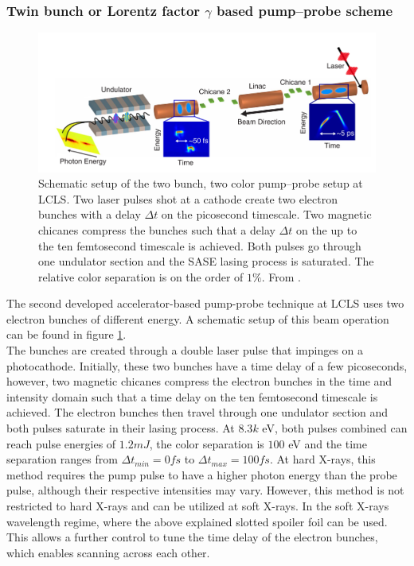 \subsubsection{Twin bunch or Lorentz factor $\gamma$ based pump--probe scheme}
\begin{figure}
	\centering
		\includegraphics[width=1.00\textwidth]{images/Agos-pump-probe-scheme.png}
	\caption[Schematic setup of the bunch based pump-probe setup.]{Schematic setup of the two bunch, two color pump--probe setup at LCLS. Two laser pulses shot at a cathode create two electron bunches with a delay $\Delta t$ on the picosecond timescale. Two magnetic chicanes compress the bunches such that a delay $\Delta t$ on the up to the ten femtosecond timescale is achieved. Both pulses go through one undulator section and the SASE lasing process is saturated. The relative color separation is on the order of $1\%$. From \citep[\href{http://creativecommons.org/licenses/by/4.0/}{\ccby}]{Marinelli-2015-NatComm}.}
	\label{fig:Agos-pump-probe-scheme}
\end{figure}
The second developed accelerator-based pump-probe technique at LCLS \cite{Marinelli-2015-NatComm} uses two electron bunches of different energy. A schematic setup of this beam operation can be found in figure \ref{fig:Agos-pump-probe-scheme}.\\
The bunches are created through a double laser pulse that impinges on a photocathode. Initially, these two bunches have a time delay of a few picoseconds, however, two magnetic chicanes compress the electron bunches in the time and intensity domain such that a time delay on the ten femtosecond timescale is achieved. The electron bunches then travel through one undulator section and both pulses saturate in their lasing process. At $8.3k$ eV, both pulses combined can reach pulse energies of $1.2mJ$, the color separation is $100$ eV and the time separation ranges from $\Delta t_{min}=0fs$ to $\Delta t_{max}=100fs$. At hard X-rays, this method requires the pump pulse to have a higher photon energy than the probe pulse, although their respective intensities may vary. However, this method is not restricted to hard X-rays and can be utilized at soft X-rays. In the soft X-rays wavelength regime, where the above explained slotted spoiler foil can be used. This allows a further control to tune the time delay of the electron bunches, which enables scanning across each other.
